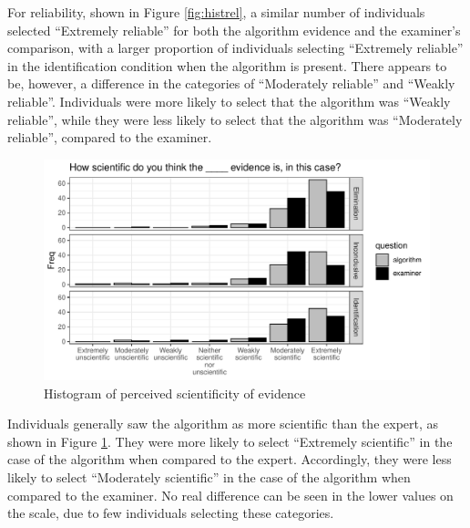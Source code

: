 \documentclass[print]{nuthesis}
\begin{document}
For reliability, shown in Figure \ref{fig:histrel}, a similar number of individuals selected ``Extremely reliable'' for both the algorithm evidence and the examiner's comparison, with a larger proportion of individuals selecting ``Extremely reliable'' in the identification condition when the algorithm is present.
There appears to be, however, a difference in the categories of ``Moderately reliable'' and ``Weakly reliable''.
Individuals were more likely to select that the algorithm was ``Weakly reliable'', while they were less likely to select that the algorithm was ``Moderately reliable'', compared to the examiner.

\begin{figure}

{\centering \includegraphics[width=\linewidth]{thesis_files/figure-latex/histsci-1} 

}

\caption{Histogram of perceived scientificity of evidence}\label{fig:histsci}
\end{figure}

Individuals generally saw the algorithm as more scientific than the expert, as shown in Figure \ref{fig:histsci}.
They were more likely to select ``Extremely scientific'' in the case of the algorithm when compared to the expert.
Accordingly, they were less likely to select ``Moderately scientific'' in the case of the algorithm when compared to the examiner.
No real difference can be seen in the lower values on the scale, due to few individuals selecting these categories.
\end{document}
